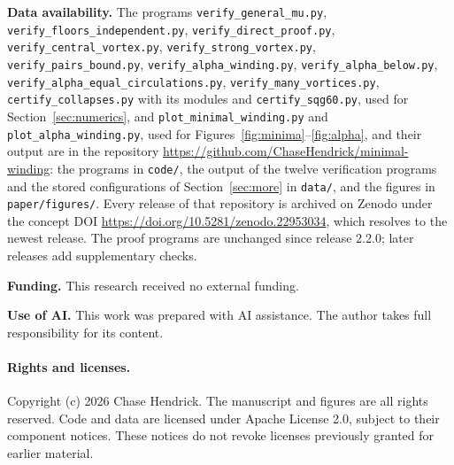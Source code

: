 \documentclass[11pt]{article}
\theoremstyle{definition}
\begin{document}
\medskip
{\raggedright\noindent\textbf{Data availability.} The programs \texttt{verify\_\allowbreak general\_\allowbreak mu.py}, \texttt{verify\_\allowbreak floors\_\allowbreak independent.py}, \texttt{verify\_\allowbreak direct\_\allowbreak proof.py}, \texttt{verify\_\allowbreak central\_\allowbreak vortex.py}, \texttt{verify\_\allowbreak strong\_\allowbreak vortex.py}, \texttt{verify\_\allowbreak pairs\_\allowbreak bound.py}, \texttt{verify\_\allowbreak alpha\_\allowbreak winding.py}, \texttt{verify\_\allowbreak alpha\_\allowbreak below.py}, \texttt{verify\_\allowbreak alpha\_\allowbreak equal\_\allowbreak circulations.py}, \texttt{verify\_\allowbreak many\_\allowbreak vortices.py}, \texttt{certify\_\allowbreak collapses.py} with its modules and \texttt{certify\_\allowbreak sqg60.py}, used for Section~\ref{sec:numerics}, and \texttt{plot\_\allowbreak minimal\_\allowbreak winding.py} and \texttt{plot\_\allowbreak alpha\_\allowbreak winding.py}, used for Figures~\ref{fig:minima}--\ref{fig:alpha}, and their output are in the repository \url{https://github.com/ChaseHendrick/minimal-winding}: the programs in \texttt{code/\allowbreak }, the output of the twelve verification programs and the stored configurations of Section~\ref{sec:more} in \texttt{data/\allowbreak }, and the figures in \texttt{paper/\allowbreak figures/\allowbreak }. Every release of that repository is archived on Zenodo under the concept DOI \url{https://doi.org/10.5281/zenodo.22953034}, which resolves to the newest release. The proof programs are unchanged since release 2.2.0; later releases add supplementary checks.\par}

\noindent\textbf{Funding.} This research received no external funding.

\noindent\textbf{Use of AI.} This work was prepared with AI assistance. The author takes full responsibility for its content.

\paragraph{Rights and licenses.}
Copyright (c) 2026 Chase Hendrick. The manuscript and figures are all rights reserved. Code and data are licensed under Apache License 2.0, subject to their component notices. These notices do not revoke licenses previously granted for earlier material.
\end{document}
